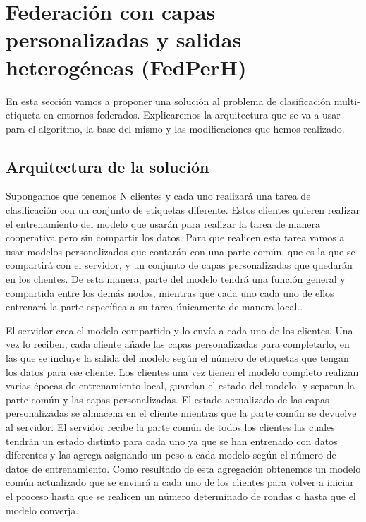 \chapter{Federación con capas personalizadas y salidas heterogéneas (FedPerH)} \label{cap3}

\vspace*{5mm}

En esta sección vamos a proponer una solución al problema de clasificación multi-etiqueta en entornos federados. Explicaremos la arquitectura que se va a usar para el algoritmo, la base del mismo y las modificaciones que hemos realizado.

\section{Arquitectura de la solución}

Supongamos que tenemos N clientes y cada uno realizará una tarea de clasificación con un conjunto de etiquetas diferente. Estos clientes quieren realizar el entrenamiento del modelo que usarán para realizar la tarea de manera cooperativa pero sin compartir los datos. Para que realicen esta tarea vamos a usar modelos personalizados que contarán con una parte común, que es la que se compartirá con el servidor, y un conjunto de capas personalizadas que quedarán en los clientes. De esta manera, parte del modelo tendrá una función general y compartida entre los demás nodos, mientras que cada uno cada uno de ellos entrenará la parte específica a su tarea únicamente de manera local.. 

El servidor crea el modelo compartido y lo envía a cada uno de los clientes. Una vez lo reciben, cada cliente añade las capas personalizadas para completarlo, en las que se incluye la salida del modelo según el número de etiquetas que tengan los datos para ese cliente. Los clientes una vez tienen el modelo completo realizan varias épocas de entrenamiento local, guardan el estado del modelo, y separan la parte común y las capas personalizadas. El estado actualizado de las capas personalizadas se almacena en el cliente mientras que la parte común se devuelve al servidor. El servidor recibe la parte común de todos los clientes las cuales tendrán un estado distinto para cada uno ya que se han entrenado con datos diferentes y las agrega asignando un peso a cada modelo según el número de datos de entrenamiento. Como resultado de esta agregación obtenemos un modelo común actualizado que se enviará a cada uno de los clientes para volver a iniciar el proceso hasta que se realicen un número determinado de rondas o hasta que el modelo converja.

